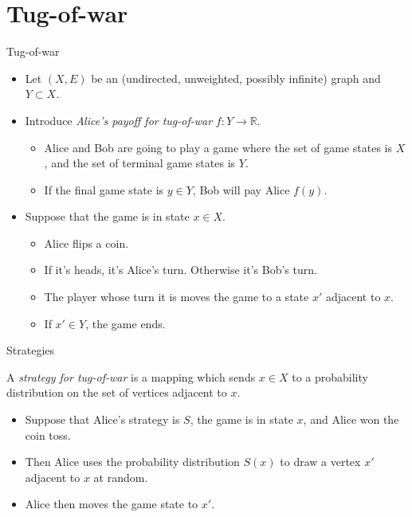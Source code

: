 \documentclass[10pt]{beamer}
\newcommand{\RR}{\mathbb{R}}
\begin{document}
\section{Tug-of-war}

\begin{frame}{Tug-of-war}
\begin{itemize}
\item Let $(X, E)$ be an (undirected, unweighted, possibly infinite) graph and $Y \subset X$. \pause
\item Introduce \emph{Alice's payoff for tug-of-war} $f: Y \to \RR$.  
\begin{itemize}
\item Alice and Bob are going to play a game where the set of game states is $X$, and the set of terminal game states is $Y$.
\item If the final game state is $y \in Y$, Bob will pay Alice $f(y)$. \pause
\end{itemize}
\item Suppose that the game is in state $x \in X$.  
\begin{itemize}
\item Alice flips a coin.
\item If it's heads, it's Alice's turn. Otherwise it's Bob's turn.
\item The player whose turn it is moves the game to a state $x'$ adjacent to $x$.
\item If $x' \in Y$, the game ends.
\end{itemize}
\end{itemize}
\end{frame}

\begin{frame}{Strategies}
\begin{definition}
A \emph{strategy for tug-of-war} is a mapping which sends $x \in X$ to a probability distribution on the set of vertices adjacent to $x$.
\end{definition} \pause

\begin{itemize} 
\item Suppose that Alice's strategy is $S$, the game is in state $x$, and Alice won the coin toss. 
\item Then Alice uses the probability distribution $S(x)$ to draw a vertex $x'$ adjacent to $x$ at random.
\item Alice then moves the game state to $x'$.
\end{itemize}
\end{frame}
\end{document}
